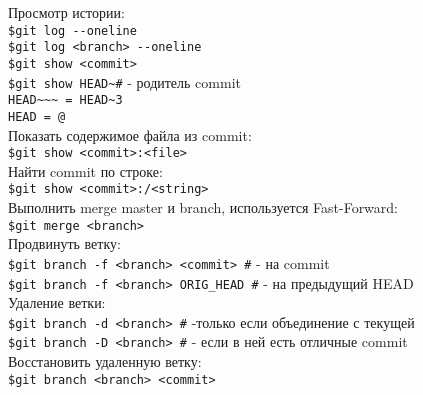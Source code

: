 \noindent Просмотр истории: \\
\indent \texttt{\$git log {-}-oneline} \\
\indent \texttt{\$git log <branch> {-}-oneline} \\
\indent \texttt{\$git show <commit>} \\
\indent \texttt{\$git show HEAD\~  \indent \#} - родитель commit \\
\indent \indent \texttt{HEAD\~{}\~{}\~{} = HEAD\~{}3}  \\
\indent \indent \texttt{HEAD = @}  \\

\noindent Показать содержимое файла из commit: \\
\indent \texttt{\$git show <commit>:<file>} \\
\noindent Найти commit по строке: \\
\indent \texttt{\$git show <commit>:/<string>} \\

\noindent Выполнить merge master и branch, используется Fast-Forward: \\
\indent \texttt{\$git merge <branch>} \\

\noindent Продвинуть ветку: \\
\indent \texttt{\$git branch -f <branch> <commit> \indent \#} - на commit   \\
\indent \texttt{\$git branch -f <branch> ORIG\_HEAD \indent \#} - на предыдущий HEAD  \\

\noindent Удаление ветки: \\
\indent \texttt{\$git branch -d <branch> \indent \#} -только если объединение с текущей \\
\indent \texttt{\$git branch -D <branch> \indent \#} - если в ней есть отличные commit \\

\noindent Восстановить удаленную ветку: \\
\indent \texttt{\$git branch <branch> <commit>} \\
